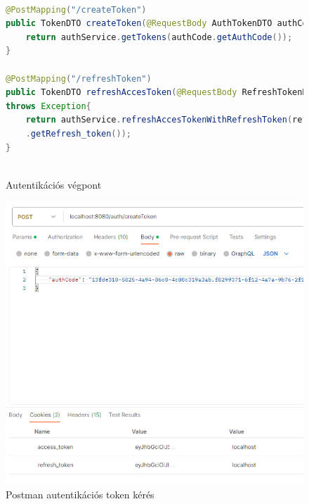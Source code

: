 \documentclass[a4paper,twoside]{article}
\begin{document}
\begin{figure}
	\caption{Autentikációs végpont}
	\centering
	\begin{lstlisting}[language=java,breaklines=true]
		
@PostMapping("/createToken")
public TokenDTO createToken(@RequestBody AuthTokenDTO authCode) throws Exception{
	return authService.getTokens(authCode.getAuthCode());
}		

@PostMapping("/refreshToken")
public TokenDTO refreshAccesToken(@RequestBody RefreshTokenDTO refreshTokenDTO)
throws Exception{
	return authService.refreshAccesTokenWithRefreshToken(refreshTokenDTO
	.getRefresh_token());
}
		
	\end{lstlisting}
	\label{authEndpoint}
\end{figure} 

\begin{figure}
	\caption{Postman autentikációs token kérés}
	\label{fig:postman}
	\centering
	\includegraphics[scale=0.5]{getTokens}
\end{figure}
\end{document}

